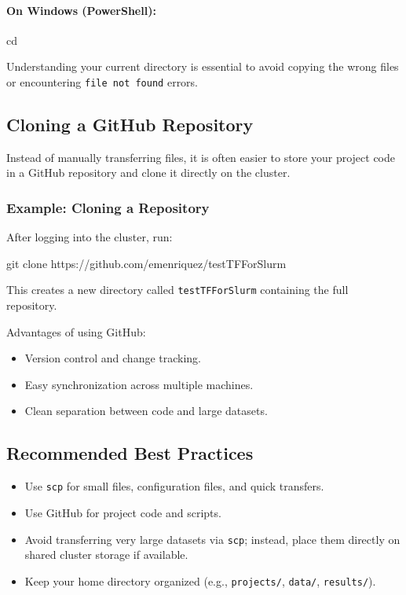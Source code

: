 \documentclass[11pt]{article}
\begin{document}
\paragraph{On Windows (PowerShell):}
\begin{codeblock}
cd
\end{codeblock}

Understanding your current directory is essential to avoid copying the wrong files
or encountering \texttt{file not found} errors.

\subsection{Cloning a GitHub Repository}
\label{subsec:git-clone}

Instead of manually transferring files, it is often easier to store your project
code in a GitHub repository and clone it directly on the cluster.

\subsubsection{Example: Cloning a Repository}

After logging into the cluster, run:

\begin{codeblock}
git clone https://github.com/emenriquez/testTFForSlurm
\end{codeblock}

This creates a new directory called \texttt{testTFForSlurm} containing the full
repository.

Advantages of using GitHub:
\begin{itemize}
  \item Version control and change tracking.
  \item Easy synchronization across multiple machines.
  \item Clean separation between code and large datasets.
\end{itemize}

\subsection{Recommended Best Practices}
\label{subsec:file-transfer-best-practices}

\begin{itemize}
  \item Use \texttt{scp} for small files, configuration files, and quick transfers.
  \item Use GitHub for project code and scripts.
  \item Avoid transferring very large datasets via \texttt{scp}; instead, place them
        directly on shared cluster storage if available.
  \item Keep your home directory organized (e.g., \texttt{projects/}, \texttt{data/}, \texttt{results/}).
\end{itemize}
\end{document}
